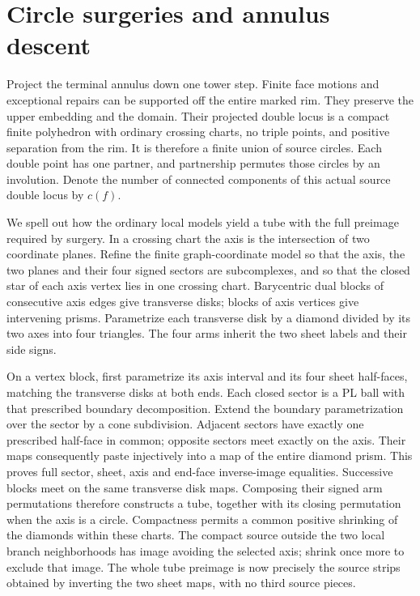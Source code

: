 \section{Circle surgeries and annulus descent}
\label{sec:dehn-annulus-descent}

Project the terminal annulus down one tower step.  Finite face motions
and exceptional repairs can be supported off the entire marked rim.
They preserve the upper embedding and the domain.  Their projected
double locus is a compact finite polyhedron with ordinary crossing
charts, no triple points, and positive separation from the rim.
It is therefore a finite union of source circles.  Each double point
has one partner, and partnership permutes those circles by an
involution.  Denote the number of connected components of this
actual source double locus by $c(f)$.

We spell out how the ordinary local models yield a tube with the
full preimage required by surgery.  In a crossing chart the axis
is the intersection of two coordinate planes.  Refine the finite
graph-coordinate model so that the axis, the two planes and their
four signed sectors are subcomplexes, and so that the closed star
of each axis vertex lies in one crossing chart.  Barycentric dual
blocks of consecutive axis edges give transverse disks; blocks of
axis vertices give intervening prisms.  Parametrize each transverse
disk by a diamond divided by its two axes into four triangles.
The four arms inherit the two sheet labels and their side signs.

On a vertex block, first parametrize its axis interval and its four
sheet half-faces, matching the transverse disks at both ends.
Each closed sector is a PL ball with that prescribed boundary
decomposition.  Extend the boundary parametrization over the sector
by a cone subdivision.  Adjacent sectors have exactly one prescribed
half-face in common; opposite sectors meet exactly on the axis.
Their maps consequently paste injectively into a map of the entire
diamond prism.  This proves full sector, sheet, axis and end-face
inverse-image equalities.  Successive blocks meet on the same
transverse disk maps.  Composing their signed arm permutations
therefore constructs a tube, together with its closing permutation
when the axis is a circle.  Compactness permits a common positive
shrinking of the diamonds within these charts.  The compact source
outside the two local branch neighborhoods has image avoiding the
selected axis; shrink once more to exclude that image.  The whole
tube preimage is now precisely the source strips obtained by
inverting the two sheet maps, with no third source pieces.

